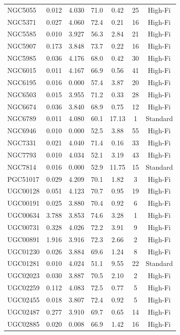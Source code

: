 \begin{longtable}{lcccccc}
NGC5055 & 0.012 & 4.030 & 71.0 & 0.42 & 25 & High-Fi \\
NGC5371 & 0.027 & 4.060 & 72.4 & 0.21 & 16 & High-Fi \\
NGC5585 & 0.010 & 3.927 & 56.3 & 2.84 & 21 & High-Fi \\
NGC5907 & 0.173 & 3.848 & 73.7 & 0.22 & 16 & High-Fi \\
NGC5985 & 0.036 & 4.176 & 68.0 & 0.42 & 30 & High-Fi \\
NGC6015 & 0.011 & 4.167 & 66.9 & 0.56 & 41 & High-Fi \\
NGC6195 & 0.016 & 0.000 & 57.4 & 3.87 & 20 & High-Fi \\
NGC6503 & 0.015 & 3.955 & 71.2 & 0.33 & 28 & High-Fi \\
NGC6674 & 0.036 & 3.840 & 68.9 & 0.75 & 12 & High-Fi \\
NGC6789 & 0.011 & 4.080 & 60.1 & 17.13 & 1 & Standard \\
NGC6946 & 0.010 & 0.000 & 52.5 & 3.88 & 55 & High-Fi \\
NGC7331 & 0.021 & 4.040 & 71.4 & 0.16 & 33 & High-Fi \\
NGC7793 & 0.010 & 4.034 & 52.1 & 3.19 & 43 & High-Fi \\
NGC7814 & 0.016 & 0.000 & 52.9 & 11.75 & 15 & Standard \\
PGC51017 & 0.029 & 4.209 & 70.1 & 1.82 & 3 & High-Fi \\
UGC00128 & 0.051 & 4.123 & 70.7 & 0.95 & 19 & High-Fi \\
UGC00191 & 0.025 & 3.880 & 70.4 & 0.92 & 6 & High-Fi \\
UGC00634 & 3.788 & 3.853 & 74.6 & 3.28 & 1 & High-Fi \\
UGC00731 & 0.328 & 4.026 & 72.2 & 3.91 & 9 & High-Fi \\
UGC00891 & 1.916 & 3.916 & 72.3 & 2.66 & 2 & High-Fi \\
UGC01230 & 0.026 & 3.884 & 69.6 & 1.24 & 8 & High-Fi \\
UGC01281 & 0.010 & 4.024 & 51.1 & 9.55 & 22 & Standard \\
UGC02023 & 0.030 & 3.887 & 70.5 & 2.10 & 2 & High-Fi \\
UGC02259 & 0.112 & 4.083 & 72.5 & 0.77 & 5 & High-Fi \\
UGC02455 & 0.018 & 3.807 & 72.4 & 0.92 & 5 & High-Fi \\
UGC02487 & 0.277 & 3.910 & 69.7 & 0.65 & 14 & High-Fi \\
UGC02885 & 0.020 & 0.008 & 66.9 & 1.42 & 16 & High-Fi \\

\end{longtable}
